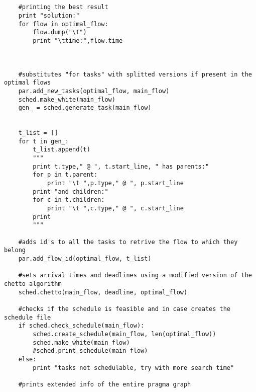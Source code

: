 \documentclass[a4paper,10pt,twoside]{book}
\begin{document}
\begin{lstlisting}[language=CCC, caption=appsched.py]
	

	#printing the best result	
	print "solution:"
	for flow in optimal_flow:
		flow.dump("\t")
		print "\ttime:",flow.time



	#substitutes "for tasks" with splitted versions if present in the optimal flows
	par.add_new_tasks(optimal_flow, main_flow)
	sched.make_white(main_flow)
	gen_ = sched.generate_task(main_flow)


	t_list = []
	for t in gen_:
		t_list.append(t)
		"""
		print t.type," @ ", t.start_line, " has parents:"
		for p in t.parent:
			print "\t ",p.type," @ ", p.start_line
		print "and children:"
		for c in t.children:
			print "\t ",c.type," @ ", c.start_line
		print
		"""
	
	#adds id's to all the tasks to retrive the flow to which they belong
	par.add_flow_id(optimal_flow, t_list)

	#sets arrival times and deadlines using a modified version of the chetto algorithm
	sched.chetto(main_flow, deadline, optimal_flow)
	
	#checks if the schedule is feasible and in case creates the schedule file
	if sched.check_schedule(main_flow):
		sched.create_schedule(main_flow, len(optimal_flow))
		sched.make_white(main_flow)
		#sched.print_schedule(main_flow)
	else:
		print "tasks not schedulable, try with more search time"

	#prints extended info of the entire pragma graph
	
\end{lstlisting}
\end{document}
